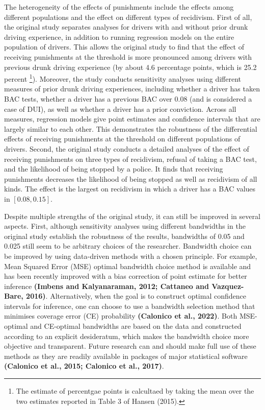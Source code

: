 \documentclass[
  11pt,
]{article}
\begin{document}
The heterogeneity of the effects of punishments include the effects
among different populations and the effect on different types of
recidivism. First of all, the original study separates analyses for
drivers with and without prior drunk driving experience, in addition to
running regression models on the entire population of drivers. This
allows the original study to find that the effect of receiving
punishments at the threshold is more pronounced among drivers with
previous drunk driving experience (by about 4.6 percentage points, which
is 25.2 percent
\footnote{The estimate of percentgae points is calcultaed by taking the mean over the two estimates reported in Table 3 of Hansen (2015).}).
Moreover, the study conducts sensitivity analyses using different
measures of prior drunk driving experiences, including whether a driver
has taken BAC tests, whether a driver has a previous BAC over 0.08 (and
is considered a case of DUI), as well as whether a driver has a prior
conviction. Across all measures, regression models give point estimates
and confidence intervals that are largely similar to each other. This
demonstrates the robustness of the differential effects of receiving
punishments at the threshold on different populations of drivers.
Second, the original study conducts a detailed analyses of the effect of
receiving punishments on three types of recidivism, refusal of taking a
BAC test, and the likelihood of being stopped by a police. It finds that
receiving punishments decreases the likelihood of being stopped as well
as recidivism of all kinds. The effect is the largest on recidivism in
which a driver has a BAC values in \([0.08, 0.15]\).

Despite multiple strengths of the original study, it can still be
improved in several aspects. First, although sensitivity analyses using
different bandwidths in the original study establish the robustness of
the results, bandwidths of 0.05 and 0.025 still seem to be arbitrary
choices of the researcher. Bandwidth choice can be improved by using
data-driven methods with a chosen principle. For example, Mean Squared
Error (MSE) optimal bandwidth choice method is available and has been
recently improved with a bias correction of point estimate for better
inference \textbf{(Imbens and Kalyanaraman, 2012; Cattaneo and
Vazquez-Bare, 2016)}. Alternatively, when the goal is to construct
optimal confidence intervals for inference, one can choose to use a
bandwidth selection method that minimises coverage error (CE)
probability \textbf{(Calonico et al., 2022)}. Both MSE-optimal and
CE-optimal bandwidths are based on the data and constructed according to
an explicit desideratum, which makes the bandwidth choice more objective
and transparent. Future research can and should make full use of these
methods as they are readily available in packages of major statistical
software \textbf{(Calonico et al., 2015; Calonico et al., 2017)}.
\end{document}
